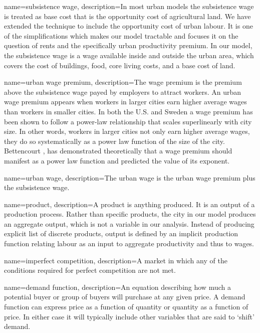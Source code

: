 {
name=subsistence wage,
description={In most urban models the subsistence wage is treated as base cost that is the opportunity cost of agricultural land. We have extended the technique to include the opportunity cost of urban labour. It is one of the simplifications which makes our model tractable and focuses it on the question of rents and the specifically urban productivity premium. In our model, the subsistence wage is a wage available inside and outside the urban area, which covers the cost of buildings, food, core living costs, and a base cost of land.}
}

{
name=urban wage premium,
description={The wage premium is the premium above the \gls{subsistence wage} payed by employers to attract workers. An urban wage premium appears when workers in larger cities earn higher average wages than workers in smaller cities. In both the U.S. and Sweden a wage premium has been shown to follow a power-law relationship that scales superlinearly with city size. In other words, workers in larger cities not only earn higher average wages, they do so systematically as a power law function of the size of the city. Bettencourt  \cite{bettencourtIntroductionUrbanScience2021}, has demonstrated theoretically that a wage premium should manifest as a power law function and predicted the value of its exponent.}
}

{
name=urban wage,
description={The \gls{urban wage} is the \gls{urban wage premium} plus the \gls{subsistence wage}.}
}

{
name=product,
description={A product is anything produced. It is an \gls{output} of a production process. %
Rather than specific products, the city in our model produces an aggregate output, which is not a variable in our analysis. Instead of producing explicit list of discrete products, output is defined by an implicit production function relating labour as an input to aggregate productivity and thus to wages. %
}
}

{
name=imperfect competition,
description={A market in which any of the conditions required for \gls{perfect competition} are not met.}
}

{
name=demand function,
description={An equation describing how much a potential buyer or group of buyers will purchase at any given price. A demand function can express price as a function of quantity or quantity as a function of price. In either case it will typically include other variables that are said to `shift' demand.}
}

